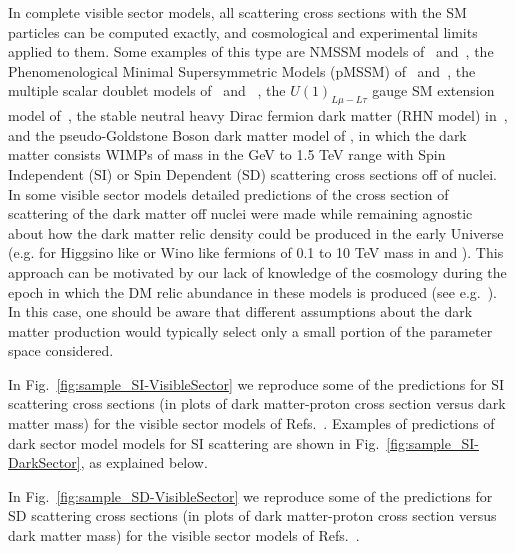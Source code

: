  In complete visible sector models, all scattering cross sections with the SM particles can be computed exactly, and cosmological and experimental limits applied to them. Some examples of this type are NMSSM models of~\cite{Lopez-Fogliani:2021qpq} and~\cite{Wang:2020xta}, the Phenomenological Minimal Supersymmetric Models (pMSSM) of~\cite{VanBeekveld:2021tgn} and~\cite{Mukherjee:2022kff}, the multiple scalar doublet models of~\cite{Cabrera:2019gaq} and ~\cite{Khater:2021wcx}, the $U(1)_{L\mu -L\tau}$ gauge SM extension model of~\cite{Singirala:2021gok}, the stable neutral heavy Dirac fermion dark matter (RHN model) in~\cite{Barger:2008qd}, 
 and the pseudo-Goldstone Boson dark matter model of \cite{Alanne:2020jwx}, in which the dark matter consists WIMPs of mass in the GeV to 1.5 TeV range with Spin Independent (SI) or Spin Dependent (SD)  scattering  cross sections off of nuclei.  
 In some visible sector models detailed predictions of the cross section of scattering of the dark matter off nuclei were made while remaining agnostic about how the dark matter relic density could be produced in the early Universe (e.g. for Higgsino like or Wino like fermions of 0.1 to 10 TeV mass in \cite{Chen:2018uqz} and \cite{Chen:2019gtm}). This approach can be motivated by our lack of knowledge of the cosmology during the epoch in which the DM relic abundance in these models is produced (see e.g.~\cite{Gelmini:2006pw, Gelmini:2006pq, Gelmini:2006mr, Berger:2020maa, Dienes:2021woi, Howard:2021ohe}).  In this case, one should be aware that different assumptions about the dark matter production would typically select only a small portion of the parameter space considered.
 
 In Fig.~\ref{fig:sample_SI-VisibleSector} we reproduce some of the predictions for SI scattering cross sections (in plots of dark matter-proton cross section versus dark matter mass)  for the visible sector models of Refs.~\cite{Lopez-Fogliani:2021qpq, Wang:2020xta, Cabrera:2019gaq, Alanne:2020jwx, Chen:2018uqz}. Examples of predictions of dark sector model models for SI scattering  are shown in Fig.~\ref{fig:sample_SI-DarkSector}, as explained below. 

In Fig.~\ref{fig:sample_SD-VisibleSector} we reproduce some of the predictions for SD scattering cross sections (in plots of dark matter-proton cross section versus dark matter mass)  for the visible sector models of Refs.~\cite{Lopez-Fogliani:2021qpq, Wang:2020xta, VanBeekveld:2021tgn, Singirala:2021gok, Barger:2008qd}. 


